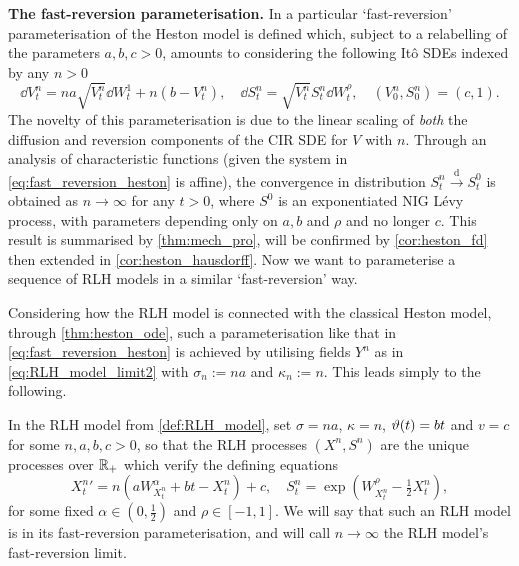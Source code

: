 \vspace{3mm}\textbf{The fast-reversion parameterisation.} In \cite{mechkov_2015} a particular `fast-reversion' parameterisation of the Heston model is defined which, subject to a relabelling of the parameters $a,b,c>0$, amounts to considering the following It\^o SDEs indexed by any $n>0$~
\begin{equation}\label{eq:fast_reversion_heston}
    \dd V^n_t = na\sqrt{V^n_t}\dd W^1_t + n(b - V^n_t),\quad \dd S^n_t = \sqrt{V^n_t}S^n_t\dd W^\rho_t,\quad (V^n_0,S^n_0)=(c,1).
\end{equation}
The novelty of this parameterisation is due to the linear scaling of \emph{both} the  diffusion and reversion components of the CIR SDE for $V$ with $n$. Through an analysis of characteristic functions (given the system in \autoref{eq:fast_reversion_heston} is affine), the convergence in distribution $S^n_t\xrightarrow{\mathrm{d}}S^0_t$ is obtained as $n\to\infty$ for any $t>0$, where $S^0$ is an exponentiated NIG L\'evy process, with parameters depending only on $a,b$ and $\rho$ and no longer $c$. This result is summarised by \autoref{thm:mech_pro}, will be confirmed by \autoref{cor:heston_fd} then extended in \autoref{cor:heston_hausdorff}. Now we want to parameterise a sequence of RLH models in a similar `fast-reversion' way.

Considering how the RLH model is connected with the classical Heston model, through \autoref{thm:heston_ode}, such a parameterisation like that in \autoref{eq:fast_reversion_heston} is achieved by utilising fields $Y^n$ as in \autoref{eq:RLH_model_limit2} with $\sigma_n:=na$ and $\kappa_n:=n$. This leads simply to the following.

\begin{definition}\label{def:fast_RLH}
    In the RLH model from \autoref{def:RLH_model}, set $\sigma=na$, $\kappa=n$, $\vartheta(t)=b t$ and $v=c$ for some $n,a,b,c>0$, so that the RLH processes $(X^n,S^n)$ are the unique processes over $\mathbb{R}_+$ which verify the defining equations
    \begin{equation}\label{eq:RLH_model_summary3}
        {X^n_t}' = n\left( a W^\alpha_{X^n_t} + b t - X^n_t\right) + c,\quad S^n_t=\exp\left(W^\rho_{X^n_t}-\tfrac12 X^n_t\right),
    \end{equation}
    for some fixed $\alpha\in(0,\frac12)$ and $\rho\in[-1,1]$. We will say that such an RLH model is in its fast-reversion parameterisation, and will call $n\to\infty$ the RLH model's fast-reversion limit.
\end{definition}

